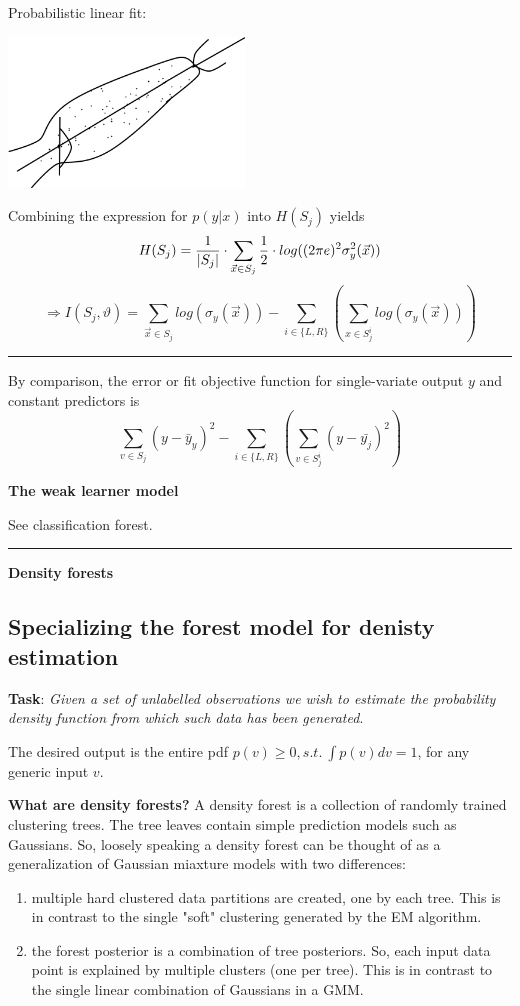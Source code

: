 \documentclass{scrartcl}
\DeclarePairedDelimiter\abs{\lvert}{\rvert}%
\begin{document}
\begin{appendices}
Probabilistic linear fit:
\begin{center}
    \includegraphics[height=4cm]{img/rf_linearfit.jpg}
\end{center}

Combining the expression for \(p(y|x)\) into \(H(S_j)\) yields
\[H(S_j) = \frac{1}{\abs{S_j}} \cdot \sum_{\vec{x} \in S_j} \frac{1}{2} \cdot log((2 \pi e)^2 \sigma_y^2(\vec{x}))\]
\[\Rightarrow I(S_j, \vartheta) = \sum_{\vec{x} \in S_j} log(\sigma_y(\vec{x})) - \sum_{i \in \{L, R\}} (\sum_{x \in S_j^i} log (\sigma_y(\vec{x}))) \]

\rule{\textwidth}{1pt}

By comparison, the error or fit objective function for single-variate output \(y\) and constant predictors is
\[\sum_{v \in S_j} (y - \bar{y}_y)^2 - \sum_{i \in \{L, R\}} (\sum_{v \in S_j^i}(y-\bar{y_j} )^2)\]

\textbf{The weak learner model}

See classification forest.

\rule{\textwidth}{1pt}

\textbf{Density forests}

\subsection{Specializing the forest model for denisty estimation}
\textbf{Task}: \textit{Given a set of unlabelled observations we wish to estimate the probability density function from which such data has been generated}.

The desired output is the entire pdf \(p(v) \geq 0, s.t. \ \int p(v) dv = 1\), for any generic input \(v\).

\textbf{What are density forests?} A density forest is a collection of randomly trained clustering trees. The tree leaves contain simple prediction models such as Gaussians. So, loosely speaking a density forest can be thought of as a generalization of Gaussian miaxture models with two differences:
\begin{enumerate}
    \item
        multiple hard clustered data partitions are created, one by each tree. This is in contrast to the single "soft" clustering generated by the EM algorithm.
    \item
        the forest posterior is a combination of tree posteriors. So, each input data point is explained by multiple clusters (one per tree). This is in contrast to the single linear combination of Gaussians in a GMM.
\end{enumerate}


\end{appendices}
\end{document}
